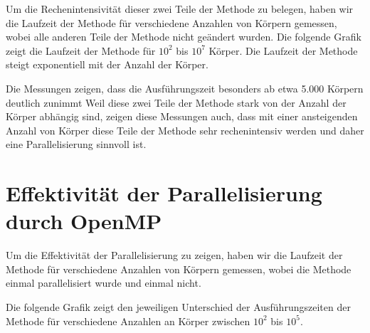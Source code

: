 \documentclass[
  ngerman,
  color=8c,
  submission,
  boxarc,
  fleqn,
]{rubos-tuda-template}
\begin{document}
Um die Rechenintensivität dieser zwei Teile der Methode zu belegen, haben wir die Laufzeit der Methode für verschiedene Anzahlen von Körpern gemessen, wobei alle anderen Teile der Methode nicht geändert wurden. Die folgende Grafik zeigt die Laufzeit der Methode für $10^2$ bis $10^7$ Körper. Die Laufzeit der Methode steigt exponentiell mit der Anzahl der Körper. 

Die Messungen zeigen, dass die Ausführungszeit besonders ab etwa 5.000 Körpern deutlich zunimmt 
Weil diese zwei Teile der Methode stark von der Anzahl der Körper abhängig sind, zeigen diese Messungen auch, dass mit einer ansteigenden Anzahl von Körper diese Teile der Methode sehr rechenintensiv werden und daher eine Parallelisierung sinnvoll ist.

\section{Effektivität der Parallelisierung durch OpenMP}



Um die Effektivität der Parallelisierung zu zeigen, haben wir die Laufzeit der Methode für verschiedene Anzahlen von Körpern gemessen, wobei die Methode einmal parallelisiert wurde und einmal nicht. 

Die folgende Grafik zeigt den jeweiligen Unterschied der Ausführungszeiten der Methode für verschiedene Anzahlen an Körper zwischen $10^2$ bis $10^5$.
\end{document}
